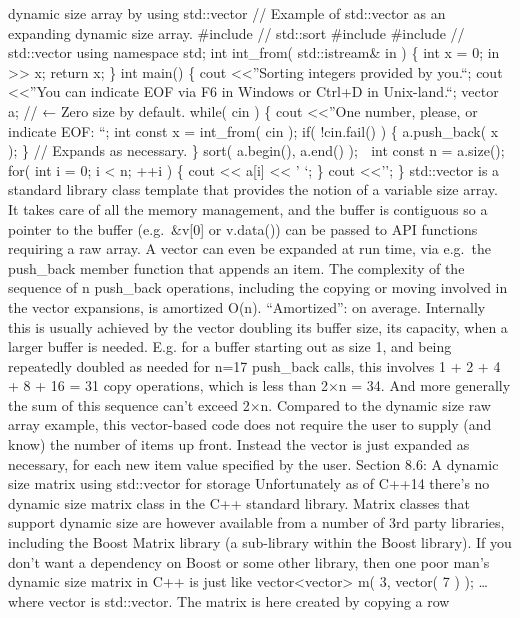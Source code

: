 dynamic size array by using std::vector // Example of std::vector as an
expanding dynamic size array. \#include // std::sort \#include \#include
// std::vector using namespace std; int int\_from( std::istream\& in )
\{ int x = 0; in \textgreater\textgreater{} x; return x; \} int main()
\{ cout \textless\textless{}''Sorting integers provided by you.\n``;
cout \textless\textless{}''You can indicate EOF via F6 in Windows or
Ctrl+D in Unix-land.\n``; vector a; // ← Zero size by default. while(
cin ) \{ cout \textless\textless{}''One number, please, or indicate EOF:
``; int const x = int\_from( cin ); if( !cin.fail() ) \{ a.push\_back( x
); \} // Expands as necessary. \} sort( a.begin(), a.end() );  int
const n = a.size(); for( int i = 0; i \textless{} n; ++i ) \{ cout
\textless\textless{} a{[}i{]} \textless\textless{} ' `; \} cout
\textless\textless{}'\n'; \} std::vector is a standard library class
template that provides the notion of a variable size array. It takes
care of all the memory management, and the buﬀer is contiguous so a
pointer to the buﬀer (e.g.~\&v{[}0{]} or v.data()) can be passed to API
functions requiring a raw array. A vector can even be expanded at run
time, via e.g.~the push\_back member function that appends an item. The
complexity of the sequence of n push\_back operations, including the
copying or moving involved in the vector expansions, is amortized O(n).
``Amortized'': on average. Internally this is usually achieved by the
vector doubling its buﬀer size, its capacity, when a larger buﬀer is
needed. E.g. for a buﬀer starting out as size 1, and being repeatedly
doubled as needed for n=17 push\_back calls, this involves 1 + 2 + 4 + 8
+ 16 = 31 copy operations, which is less than 2×n = 34. And more
generally the sum of this sequence can't exceed 2×n. Compared to the
dynamic size raw array example, this vector-based code does not require
the user to supply (and know) the number of items up front. Instead the
vector is just expanded as necessary, for each new item value speciﬁed
by the user. Section 8.6: A dynamic size matrix using std::vector for
storage Unfortunately as of C++14 there's no dynamic size matrix class
in the C++ standard library. Matrix classes that support dynamic size
are however available from a number of 3rd party libraries, including
the Boost Matrix library (a sub-library within the Boost library). If
you don't want a dependency on Boost or some other library, then one
poor man's dynamic size matrix in C++ is just like
vector\textless vector\textgreater{} m( 3, vector( 7 ) ); \ldots{} where
vector is std::vector. The matrix is here created by copying a row
